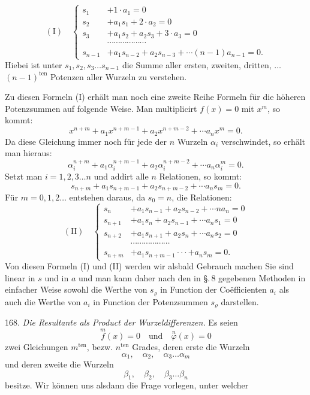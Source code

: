 \[
(\mathrm{I}) \quad
\left\{
\begin{aligned}
s_1 &+ 1 \cdot a_1 = 0 \\
s_2 &+ a_1 s_1 + 2 \cdot a_2 = 0 \\
s_3 &+ a_1 s_2 + a_2 s_3 + 3 \cdot a_3 = 0 \\
& \cdots\cdots\cdots\cdots\cdots\cdots \\
s_{n-1} &+ a_1 s_{n-2} + a_2 s_{n-3} + \cdots (n-1) a_{n-1} = 0.
\end{aligned}
\right.
\]
Hiebei ist unter $s_1, s_2, s_3 \ldots s_{n-1}$ die Summe aller ersten, zweiten,
dritten, $\ldots$ $(n-1)^{\mathrm{ten}}$ Potenzen aller Wurzeln zu verstehen.

Zu diesen Formeln (I) erhält man noch eine zweite Reihe Formeln für die
höheren Potenzsummen auf folgende Weise. Man multiplicirt $f(x) = 0$ mit
$x^m$, so kommt:
\[
x^{n+m} + a_1 x^{n+m-1} + a_2 x^{n+m-2} + \cdots a_n x^m = 0.
\]
Da diese Gleichung immer noch für jede der $n$ Wurzeln $\alpha_i$
verschwindet, so erhält man hieraus:
\[
\alpha_i^{n+m} + a_1 \alpha_i^{n+m-1} + a_2 \alpha_i^{n+m-2} + \cdots a_n \alpha_i^m = 0.
\]
Setzt man $i = 1, 2, 3 \ldots n$ und addirt alle $n$ Relationen, so kommt:
\[
s_{n+m} + a_1 s_{n+m-1} + a_2 s_{n+m-2} + \cdots a_n s_m = 0.
\]
Für $m = 0, 1, 2 \ldots$ entstehen daraus, da $s_0 = n$, die Relationen:
\[
(\mathrm{II}) \quad
\left\{
\begin{aligned}
s_n &+ a_1 s_{n-1} + a_2 s_{n-2} + \cdots n a_n = 0 \\
s_{n+1} &+ a_1 s_n + a_2 s_{n-1} + \cdots a_n s_1 = 0 \\
s_{n+2} &+ a_1 s_{n+1} + a_2 s_n + \cdots a_n s_2 = 0 \\
& \cdots\cdots\cdots\cdots\cdots\cdots \\
s_{n+m} &+ a_1 s_{n+m-1} \cdot\cdot\cdot + a_n s_m = 0.
\end{aligned}
\right.
\]
Von diesen Formeln (I) und (II) werden wir alsbald Gebrauch machen
Sie sind linear in $s$ und in $a$ und man kann daher nach den in \S.\,8
gegebenen Methoden in einfacher Weise sowohl die Werthe von $s_\varrho$ in
Function der Coëfficienten $a_i$ als auch die Werthe von $a_i$ in Function
der Potenzsummen $s_\varrho$ darstellen.

168. \textit{Die Resultante als Product der Wurzeldifferenzen.} Es seien
\[
\overset{m}{f}(x) = 0 \quad \text{und} \quad \overset{n}{\varphi}(x) = 0
\]
zwei Gleichungen $m^{\mathrm{ten}}$, bezw. $n^{\mathrm{ten}}$ Grades, deren
erste die Wurzeln
\[
\alpha_1, \quad \alpha_2, \quad \alpha_3 \ldots \alpha_m
\]
und deren zweite die Wurzeln
\[
\beta_1, \quad \beta_2, \quad \beta_3 \ldots \beta_n
\]
besitze. Wir können uns alsdann die Frage vorlegen, unter welcher


